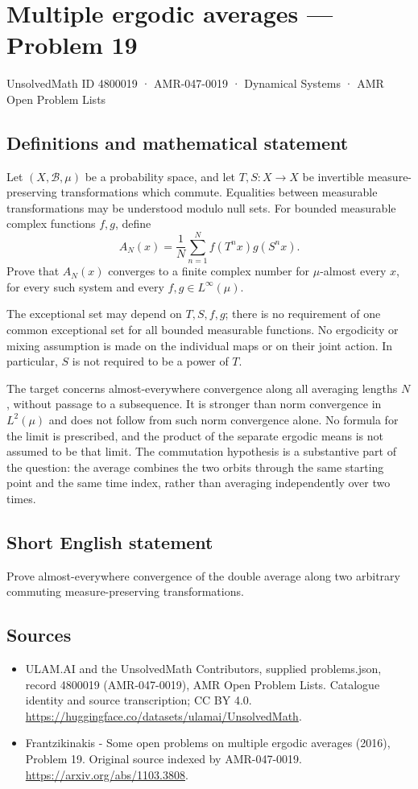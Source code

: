 \documentclass[11pt,a4paper]{article}
\begin{document}
\section*{Multiple ergodic averages — Problem 19}\label{4800019}
{\small UnsolvedMath ID 4800019 · AMR-047-0019 · Dynamical Systems · AMR Open Problem Lists}
\subsection{Definitions and mathematical statement}
Let $(X,\mathcal B,\mu)$ be a probability space, and let
$T,S:X\to X$ be invertible measure-preserving transformations
which commute. Equalities between measurable transformations
may be understood modulo null sets. For bounded measurable
complex functions $f,g$, define
\[
                 A_N(x)=\frac1N\sum_{n=1}^N
                              f(T^n x)g(S^n x).
\]
Prove that $A_N(x)$ converges to a finite complex number
for $\mu$-almost every $x$, for every such system and
every $f,g\in L^\infty(\mu)$.

The exceptional set may depend on $T,S,f,g$; there
is no requirement of one common exceptional set for
all bounded measurable functions. No ergodicity or
mixing assumption is made on the individual maps or
on their joint action. In particular, $S$ is not
required to be a power of $T$.

The target concerns almost-everywhere convergence along
all averaging lengths $N$, without passage to a
subsequence. It is stronger than norm convergence
in $L^2(\mu)$ and does not follow from such norm
convergence alone. No formula for the limit is
prescribed, and the product of the separate ergodic
means is not assumed to be that limit. The
commutation hypothesis is a substantive part of the
question: the average combines the two orbits through
the same starting point and the same time index,
rather than averaging independently over two times.
\subsection{Short English statement}
Prove almost-everywhere convergence of the double average along two arbitrary commuting measure-preserving transformations.
\subsection{Sources}
\begin{itemize}
\item[S1] ULAM.AI and the UnsolvedMath Contributors, supplied problems.json, record 4800019 (AMR-047-0019), AMR Open Problem Lists. Catalogue identity and source transcription; CC BY 4.0.
\url{https://huggingface.co/datasets/ulamai/UnsolvedMath}.
\item[S2] Frantzikinakis - Some open problems on multiple ergodic averages (2016), Problem 19. Original source indexed by AMR-047-0019.
\url{https://arxiv.org/abs/1103.3808}.
\end{itemize}
\end{document}
